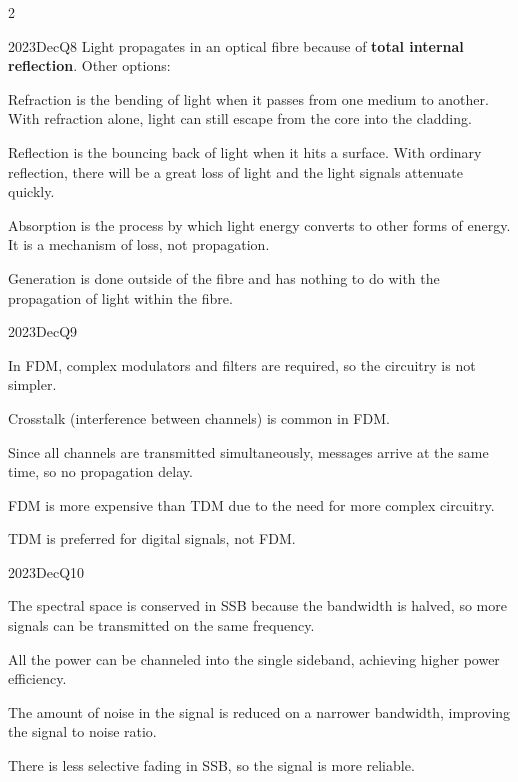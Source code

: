 \begin{multicols}{2}
\begin{qsolution}{2023}{Dec}{Q8}{\tgElectronics \tgElectronicsFibreOptics}
    Light propagates in an optical fibre because of \textbf{total internal reflection}.
    Other options:
    \begin{enumualpha}
        \item Refraction is the bending of light when it passes from one medium to another.
            With refraction alone, light can still escape from the core into the cladding.
        \item Reflection is the bouncing back of light when it hits a surface.
            With ordinary reflection, there will be a great loss of light and the light signals attenuate quickly.
        \item Absorption is the process by which light energy converts to other forms of energy.
            It is a mechanism of loss, not propagation.
        \item[(E)] Generation is done outside of the fibre and has nothing to do with the propagation of light within the fibre.
    \end{enumualpha}
\end{qsolution}

\begin{qsolution}[25]{2023}{Dec}{Q9}{\tgElectronics \tgElectronicsMultiplexing}

    \begin{enumualpha}
        \item In FDM, complex modulators and filters are required, so the circuitry is not simpler.
        \item Crosstalk (interference between channels) is common in FDM.
        \item Since all channels are transmitted simultaneously, messages arrive at the same time, so no propagation delay.
        \item FDM is more expensive than TDM due to the need for more complex circuitry.
        \item TDM is preferred for digital signals, not FDM.
    \end{enumualpha}
\end{qsolution}

\begin{qsolution}{2023}{Dec}{Q10}{\tgElectronics \tgElectronicsAM}

    \begin{enumualpha}
        \item The spectral space is conserved in SSB because the bandwidth is halved, so more signals can be transmitted on the same frequency.
        \item All the power can be channeled into the single sideband, achieving higher power efficiency.
        \item The amount of noise in the signal is reduced on a narrower bandwidth, improving the signal to noise ratio.
        \item There is less selective fading in SSB, so the signal is more reliable.
    \end{enumualpha}
\end{qsolution}


\end{multicols}
